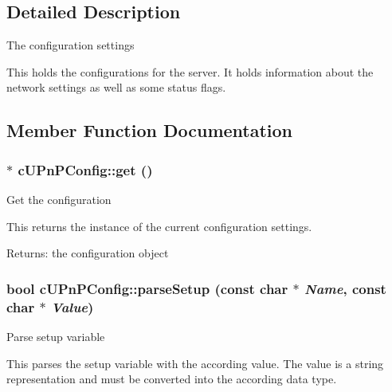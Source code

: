 \subsection{Detailed Description}
The configuration settings

This holds the configurations for the server. It holds information about the network settings as well as some status flags. 

\subsection{Member Function Documentation}
\hypertarget{classcUPnPConfig_3949dcc8a418edb8a0ece2dce62f515c}{
\subsubsection[{get}]{ $\ast$ cUPnPConfig::get ()}}
\label{classcUPnPConfig_3949dcc8a418edb8a0ece2dce62f515c}


Get the configuration

This returns the instance of the current configuration settings.

\begin{Desc}
\item[Returns:]the configuration object \end{Desc}
\hypertarget{classcUPnPConfig_3ac0d1253dba86cb4630bc1e29a9fe10}{
\subsubsection[{parseSetup}]{\setlength{\rightskip}{0pt plus 5cm}bool cUPnPConfig::parseSetup (const char $\ast$ {\em Name}, \/  const char $\ast$ {\em Value})}}
\label{classcUPnPConfig_3ac0d1253dba86cb4630bc1e29a9fe10}


Parse setup variable

This parses the setup variable with the according value. The value is a string representation and must be converted into the according data type.

